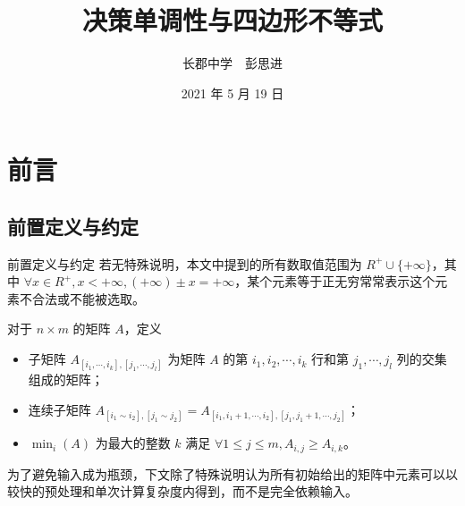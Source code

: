 \documentclass{beamer}
\title{决策单调性与四边形不等式}
\author{长郡中学\ \ 彭思进}
\date{2021 年 5 月 19 日}
\begin{document}
\begin{frame}
\titlepage
\end{frame}
\section{前言}
\subsection{前置定义与约定}
\begin{frame}{前置定义与约定}
	若无特殊说明，本文中提到的所有数取值范围为 $R^+ \cup \{+\infty\}$，其中 $\forall x \in R^+, x < +\infty,(+\infty)\pm x = +\infty$，某个元素等于正无穷常常表示这个元素不合法或不能被选取。
	
	对于 $n \times m$ 的矩阵 $A$，定义 
	\begin{itemize}
		\item 子矩阵 $A_{[i_1,\cdots,i_k],[j_1,\cdots,j_l]}$ 为矩阵 $A$ 的第 $i_1,i_2,\cdots,i_k$ 行和第 $j_1,\cdots,j_l$ 列的交集组成的矩阵；
		\item 连续子矩阵 $A_{[i_1 \sim i_2],[j_1 \sim j_2]} = A_{[i_1,i_1+1,\cdots,i_2],[j_1,j_1+1,\cdots,j_2]}$；
		\item $\min_i(A)$ 为最大的整数 $k$ 满足 $\forall 1 \leq j \leq m, A_{i,j} \geq A_{i,k}$。
	\end{itemize}

	为了避免输入成为瓶颈，下文除了特殊说明认为所有初始给出的矩阵中元素可以以较快的预处理和单次计算复杂度内得到，而不是完全依赖输入。
\end{frame}
\end{document}
